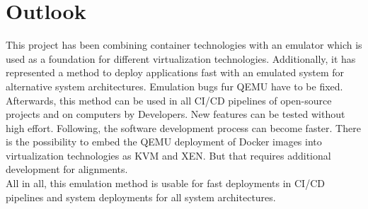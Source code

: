 \chapter{Outlook}\label{ch:outlook}

This project has been combining container technologies with an emulator which is used as a foundation for different virtualization technologies. 
Additionally, it has represented a method to deploy applications fast with an emulated system for alternative system architectures.
Emulation bugs fur QEMU have to be fixed. Afterwards, this method can be used in all CI/CD pipelines of open-source projects and on computers by Developers.
New features can be tested without high effort. Following, the software development process can become faster.
There is the possibility to embed the QEMU deployment of Docker images into virtualization technologies as KVM and XEN.
But that requires additional development for alignments. \\
All in all, this emulation method is usable for fast deployments in CI/CD pipelines and system deployments for all system architectures.